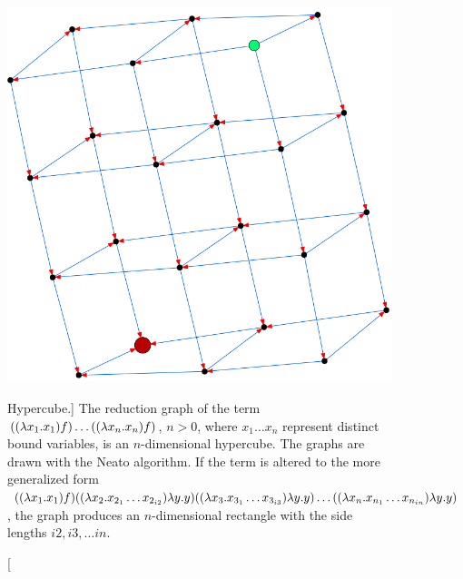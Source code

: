 \begin{figure}[htbp]
{		\includegraphics[height=\exampleheight]{../images/Cube3d_2_NEATO.png}
	}
	\caption
	[Hypercube.]
	{The reduction graph of the term $((\lambda x_1.x_1) f)\hdots((\lambda x_n.x_n) f)$,
	$n>0$, where $x_1\hdots x_n$ represent distinct bound variables,
	is an $n$-dimensional hypercube. The graphs are drawn with the Neato algorithm. If
	the term is altered to the more generalized form 
	$((\lambda x_1.x_1) f)((\lambda x_2.x_{2_1} \hdots x_{2_{i2}}) \lambda y.y)((\lambda x_3.x_{3_1} \hdots x_{3_{i3}}) \lambda y.y)\hdots((\lambda x_n.x_{n_1} \hdots x_{n_{in}}) \lambda y.y)$,
	the graph produces an $n$-dimensional rectangle with the side lengths
	$i2, i3, \hdots in$.}
	\label{fig:images_Cube1d_NEATO}
\end{figure}

